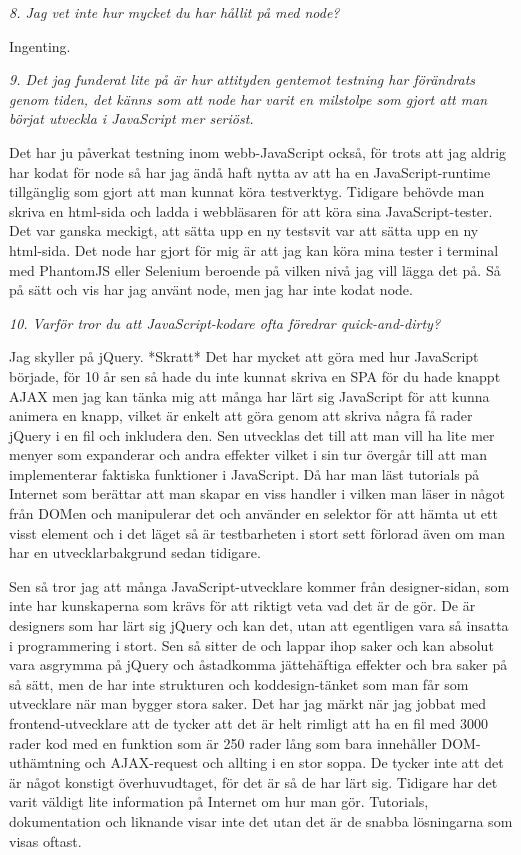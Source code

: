 \documentclass[11pt]{article}
\begin{document}
\emph{8. Jag vet inte hur mycket du har hållit på med node?}

Ingenting.

\emph{9. Det jag funderat lite på är hur attityden gentemot testning har förändrats genom tiden, det känns som att node har varit en milstolpe som gjort att man börjat utveckla i JavaScript mer seriöst.}

Det har ju påverkat testning inom webb-JavaScript också, för trots att jag aldrig har kodat för node så har jag ändå haft nytta av att ha en JavaScript-runtime tillgänglig som gjort att man kunnat köra testverktyg. Tidigare behövde man skriva en html-sida och ladda i webbläsaren för att köra sina JavaScript-tester. Det var ganska meckigt, att sätta upp en ny testsvit var att sätta upp en ny html-sida. Det node har gjort för mig är att jag kan köra mina tester i terminal med PhantomJS eller Selenium beroende på vilken nivå jag vill lägga det på. Så på sätt och vis har jag använt node, men jag har inte kodat node.

\emph{10. Varför tror du att JavaScript-kodare ofta föredrar quick-and-dirty?}

Jag skyller på jQuery. *Skratt* Det har mycket att göra med hur JavaScript började, för 10 år sen så hade du inte kunnat skriva en SPA för du hade knappt AJAX men jag kan tänka mig att många har lärt sig JavaScript för att kunna animera en knapp, vilket är enkelt att göra genom att skriva några få rader jQuery i en fil och inkludera den. Sen utvecklas det till att man vill ha lite mer menyer som expanderar och andra effekter vilket i sin tur övergår till att man implementerar faktiska funktioner i JavaScript. Då har man läst tutorials på Internet som berättar att man skapar en viss handler i vilken man läser in något från DOMen och manipulerar det och använder en selektor för att hämta ut ett visst element och i det läget så är testbarheten i stort sett förlorad även om man har en utvecklarbakgrund sedan tidigare.

Sen så tror jag att många JavaScript-utvecklare kommer från designer-sidan, som inte har kunskaperna som krävs för att riktigt veta vad det är de gör. De är designers som har lärt sig jQuery och kan det, utan att egentligen vara så insatta i programmering i stort. Sen så sitter de och lappar ihop saker och kan absolut vara asgrymma på jQuery och åstadkomma jättehäftiga effekter och bra saker på så sätt, men de har inte strukturen och koddesign-tänket som man får som utvecklare när man bygger stora saker. Det har jag märkt när jag jobbat med frontend-utvecklare att de tycker att det är helt rimligt att ha en fil med 3000 rader kod med en funktion som är 250 rader lång som bara innehåller DOM-uthämtning och AJAX-request och allting i en stor soppa. De tycker inte att det är något konstigt överhuvudtaget, för det är så de har lärt sig. Tidigare har det varit väldigt lite information på Internet om hur man gör. Tutorials, dokumentation och liknande visar inte det utan det är de snabba lösningarna som visas oftast.
\end{document}
